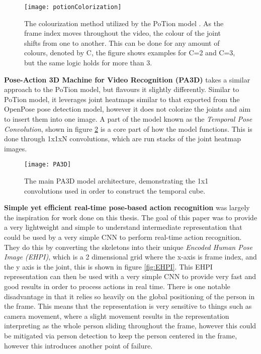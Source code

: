 \begin{figure}[ht]
	\texttt{[image: potionColorization]}
	\centering
	\caption{The colourization method utilized by the PoTion model \cite{potion}. As the frame index moves throughout the video, the colour of the joint shifts from one to another. This can be done for any amount of colours, denoted by C, the figure shows examples for C=2 and C=3, but the same logic holds for more than 3.}
	\label{fig:potion-colourization}
\end{figure}

\textbf{Pose-Action 3D Machine for Video Recognition (PA3D)} \cite{PA3D} takes a similar approach to the PoTion model, but flavours it slightly differently. Similar to PoTion model, it leverages joint heatmaps similar to that exported from the OpenPose pose detection model, however it does not colorize the joints and aim to insert them into one image. A part of the model known as the \textit{Temporal Pose Convolution}, shown in figure \ref{fig:PA3D} is a core part of how the model functions. This is done through 1x1xN convolutions, which are run stacks of the joint heatmap images.

\begin{figure}[ht]
	\texttt{[image: PA3D]}
	\centering
	\caption{The main PA3D \cite{PA3D} model architecture, demonstrating the 1x1 convolutions used in order to construct the temporal cube.}
	\label{fig:PA3D}
\end{figure}

\textbf{Simple yet efficient real-time pose-based action recognition} \cite{simple_yet_efficient} was largely the inspiration for work done on this thesis. The goal of this paper was to provide a very lightweight and simple to understand intermediate representation that could be used by a very simple CNN to perform real-time action recognition. They do this by converting the skeletons into their unique \textit{Encoded Human Pose Image (EHPI)}, which is a 2 dimensional grid where the x-axis is frame index, and the y axis is the joint, this is shown in figure \ref{fig:EHPI}. This EHPI representation can then be used with a very simple CNN to provide very fast and good results in order to process actions in real time. There is one notable disadvantage in that it relies so heavily on the global positioning of the person in the frame. This means that the representation is very sensitive to things such as camera movement, where a slight movement results in the representation interpreting as the whole person sliding throughout the frame, however this could be mitigated via person detection to keep the person centered in the frame, however this introduces another point of failure.

